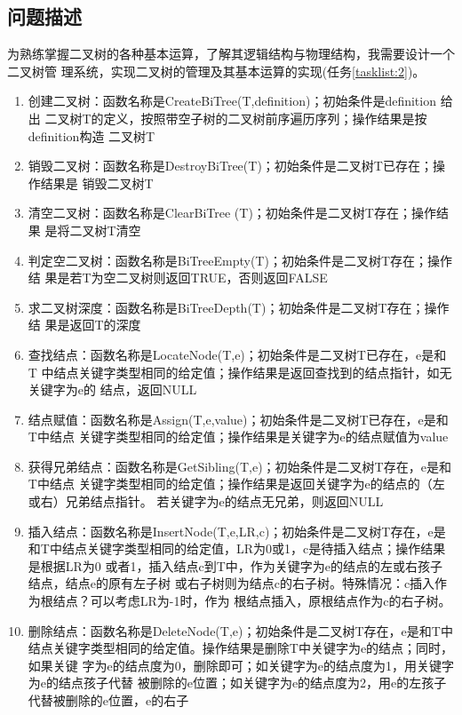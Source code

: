 \documentclass[supercite]{Experimental_Report}
\theoremstyle{definition}
\begin{document}
\subsection{问题描述}
	为熟练掌握二叉树的各种基本运算，了解其逻辑结构与物理结构，我需要设计一个二叉树管
	理系统，实现二叉树的管理及其基本运算的实现(任务\ref{tasklist:2})。
	\begin{enumerate}\label{tasklist:2}
		\item 
		创建二叉树：函数名称是CreateBiTree(T,definition)；初始条件是definition 给出
		二叉树T的定义，按照带空子树的二叉树前序遍历序列；操作结果是按definition构造
		二叉树T
		\item 
		销毁二叉树：函数名称是DestroyBiTree(T)；初始条件是二叉树T已存在；操作结果是
		销毁二叉树T
		\item 清空二叉树：函数名称是ClearBiTree (T)；初始条件是二叉树T存在；操作结果
		是将二叉树T清空
		\item 判定空二叉树：函数名称是BiTreeEmpty(T)；初始条件是二叉树T存在；操作结
		果是若T为空二叉树则返回TRUE，否则返回FALSE
		\item 求二叉树深度：函数名称是BiTreeDepth(T)；初始条件是二叉树T存在；操作结
		果是返回T的深度
		\item 查找结点：函数名称是LocateNode(T,e)；初始条件是二叉树T已存在，e是和T
		中结点关键字类型相同的给定值；操作结果是返回查找到的结点指针，如无关键字为e的
		结点，返回NULL
		\item 
		结点赋值：函数名称是Assign(T,e,value)；初始条件是二叉树T已存在，e是和T中结点
		关键字类型相同的给定值；操作结果是关键字为e的结点赋值为value
		\item 
		获得兄弟结点：函数名称是GetSibling(T,e)；初始条件是二叉树T存在，e是和T中结点
		关键字类型相同的给定值；操作结果是返回关键字为e的结点的（左或右）兄弟结点指针。
		若关键字为e的结点无兄弟，则返回NULL
		\item 插入结点：函数名称是InsertNode(T,e,LR,c)；初始条件是二叉树T存在，e是
		和T中结点关键字类型相同的给定值，LR为0或1，c是待插入结点；操作结果是根据LR为0
		或者1，插入结点c到T中，作为关键字为e的结点的左或右孩子结点，结点e的原有左子树
		或右子树则为结点c的右子树。特殊情况：c插入作为根结点？可以考虑LR为-1时，作为
		根结点插入，原根结点作为c的右子树。
		\item 删除结点：函数名称是DeleteNode(T,e)；初始条件是二叉树T存在，e是和T中
		结点关键字类型相同的给定值。操作结果是删除T中关键字为e的结点；同时，如果关键
		字为e的结点度为0，删除即可；如关键字为e的结点度为1，用关键字为e的结点孩子代替
		被删除的e位置；如关键字为e的结点度为2，用e的左孩子代替被删除的e位置，e的右子

\end{enumerate}
\end{document}
